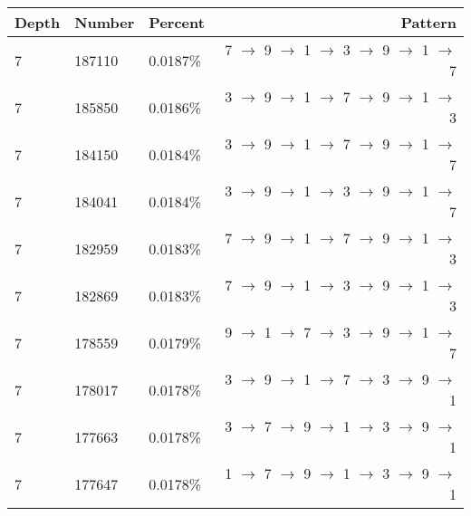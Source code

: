 \documentclass[13pt]{article}
\begin{document}
\begin{tabular}{ l l l r }
  Depth & Number & Percent & Pattern \\
  \hline
  7 & 187110 & 0.0187\% & 7 $\rightarrow$ 9 $\rightarrow$ 1 $\rightarrow$ 3 $\rightarrow$ 9 $\rightarrow$ 1 $\rightarrow$ 7\\
  7 & 185850 & 0.0186\% & 3 $\rightarrow$ 9 $\rightarrow$ 1 $\rightarrow$ 7 $\rightarrow$ 9 $\rightarrow$ 1 $\rightarrow$ 3\\
  7 & 184150 & 0.0184\% & 3 $\rightarrow$ 9 $\rightarrow$ 1 $\rightarrow$ 7 $\rightarrow$ 9 $\rightarrow$ 1 $\rightarrow$ 7\\
  7 & 184041 & 0.0184\% & 3 $\rightarrow$ 9 $\rightarrow$ 1 $\rightarrow$ 3 $\rightarrow$ 9 $\rightarrow$ 1 $\rightarrow$ 7\\
  7 & 182959 & 0.0183\% & 7 $\rightarrow$ 9 $\rightarrow$ 1 $\rightarrow$ 7 $\rightarrow$ 9 $\rightarrow$ 1 $\rightarrow$ 3\\
  7 & 182869 & 0.0183\% & 7 $\rightarrow$ 9 $\rightarrow$ 1 $\rightarrow$ 3 $\rightarrow$ 9 $\rightarrow$ 1 $\rightarrow$ 3\\
  7 & 178559 & 0.0179\% & 9 $\rightarrow$ 1 $\rightarrow$ 7 $\rightarrow$ 3 $\rightarrow$ 9 $\rightarrow$ 1 $\rightarrow$ 7\\
  7 & 178017 & 0.0178\% & 3 $\rightarrow$ 9 $\rightarrow$ 1 $\rightarrow$ 7 $\rightarrow$ 3 $\rightarrow$ 9 $\rightarrow$ 1\\
  7 & 177663 & 0.0178\% & 3 $\rightarrow$ 7 $\rightarrow$ 9 $\rightarrow$ 1 $\rightarrow$ 3 $\rightarrow$ 9 $\rightarrow$ 1\\
  7 & 177647 & 0.0178\% & 1 $\rightarrow$ 7 $\rightarrow$ 9 $\rightarrow$ 1 $\rightarrow$ 3 $\rightarrow$ 9 $\rightarrow$ 1\\
  \end{tabular}
\end{document}
